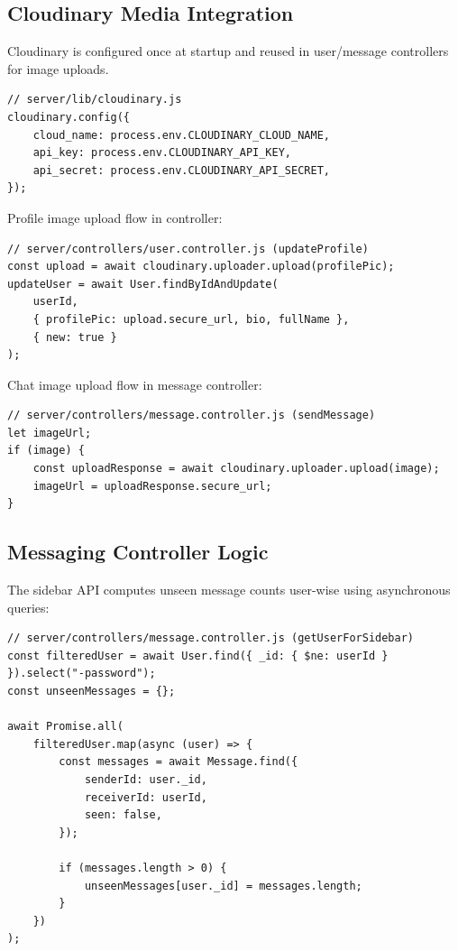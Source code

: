 \documentclass[12pt,a4paper]{report}
\begin{document}
\subsection{Cloudinary Media Integration}
Cloudinary is configured once at startup and reused in user/message controllers for image uploads.

\begin{verbatim}
// server/lib/cloudinary.js
cloudinary.config({
    cloud_name: process.env.CLOUDINARY_CLOUD_NAME,
    api_key: process.env.CLOUDINARY_API_KEY,
    api_secret: process.env.CLOUDINARY_API_SECRET,
});
\end{verbatim}

Profile image upload flow in controller:

\begin{verbatim}
// server/controllers/user.controller.js (updateProfile)
const upload = await cloudinary.uploader.upload(profilePic);
updateUser = await User.findByIdAndUpdate(
    userId,
    { profilePic: upload.secure_url, bio, fullName },
    { new: true }
);
\end{verbatim}

Chat image upload flow in message controller:

\begin{verbatim}
// server/controllers/message.controller.js (sendMessage)
let imageUrl;
if (image) {
    const uploadResponse = await cloudinary.uploader.upload(image);
    imageUrl = uploadResponse.secure_url;
}
\end{verbatim}

\subsection{Messaging Controller Logic}
The sidebar API computes unseen message counts user-wise using asynchronous queries:

\begin{verbatim}
// server/controllers/message.controller.js (getUserForSidebar)
const filteredUser = await User.find({ _id: { $ne: userId } }).select("-password");
const unseenMessages = {};

await Promise.all(
    filteredUser.map(async (user) => {
        const messages = await Message.find({
            senderId: user._id,
            receiverId: userId,
            seen: false,
        });

        if (messages.length > 0) {
            unseenMessages[user._id] = messages.length;
        }
    })
);
\end{verbatim}
\end{document}
